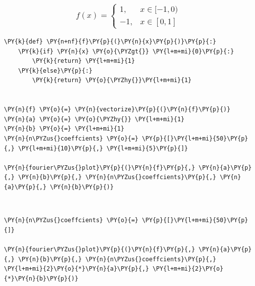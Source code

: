     \hypertarget{fx-begincases-1-x-in--1-0--1-x-in-0-1-endcases}{%
\subsubsection{\texorpdfstring{\[f(x) = \begin{cases} 1, & x \in [-1, 0) \\ -1, & x \in [0, 1] \end{cases}\]}{f(x) = \textbackslash begin\{cases\} 1, \& x \textbackslash in {[}-1, 0) \textbackslash\textbackslash{} -1, \& x \textbackslash in {[}0, 1{]} \textbackslash end\{cases\}}}\label{fx-begincases-1-x-in--1-0--1-x-in-0-1-endcases}}

    \begin{tcolorbox}[breakable, size=fbox, boxrule=1pt, pad at break*=1mm,colback=cellbackground, colframe=cellborder]
\begin{Verbatim}[commandchars=\\\{\}]
\PY{k}{def} \PY{n+nf}{f}\PY{p}{(}\PY{n}{x}\PY{p}{)}\PY{p}{:}
    \PY{k}{if} \PY{n}{x} \PY{o}{\PYZgt{}} \PY{l+m+mi}{0}\PY{p}{:}
        \PY{k}{return} \PY{l+m+mi}{1}
    \PY{k}{else}\PY{p}{:}
        \PY{k}{return} \PY{o}{\PYZhy{}}\PY{l+m+mi}{1}


\PY{n}{f} \PY{o}{=} \PY{n}{vectorize}\PY{p}{(}\PY{n}{f}\PY{p}{)}
\PY{n}{a} \PY{o}{=} \PY{o}{\PYZhy{}} \PY{l+m+mi}{1}
\PY{n}{b} \PY{o}{=} \PY{l+m+mi}{1}
\PY{n}{n\PYZus{}coeffcients} \PY{o}{=} \PY{p}{[}\PY{l+m+mi}{50}\PY{p}{,} \PY{l+m+mi}{10}\PY{p}{,} \PY{l+m+mi}{5}\PY{p}{]}

\PY{n}{fourier\PYZus{}plot}\PY{p}{(}\PY{n}{f}\PY{p}{,} \PY{n}{a}\PY{p}{,} \PY{n}{b}\PY{p}{,} \PY{n}{n\PYZus{}coeffcients}\PY{p}{,} \PY{n}{a}\PY{p}{,} \PY{n}{b}\PY{p}{)}
\end{Verbatim}
\end{tcolorbox}

    \begin{center}
    \end{center}
    { \hspace*{\fill} \\}
    
    \begin{tcolorbox}[breakable, size=fbox, boxrule=1pt, pad at break*=1mm,colback=cellbackground, colframe=cellborder]
\begin{Verbatim}[commandchars=\\\{\}]
\PY{n}{n\PYZus{}coeffcients} \PY{o}{=} \PY{p}{[}\PY{l+m+mi}{50}\PY{p}{]}

\PY{n}{fourier\PYZus{}plot}\PY{p}{(}\PY{n}{f}\PY{p}{,} \PY{n}{a}\PY{p}{,} \PY{n}{b}\PY{p}{,} \PY{n}{n\PYZus{}coeffcients}\PY{p}{,} \PY{l+m+mi}{2}\PY{o}{*}\PY{n}{a}\PY{p}{,} \PY{l+m+mi}{2}\PY{o}{*}\PY{n}{b}\PY{p}{)}
\end{Verbatim}
\end{tcolorbox}

    \begin{center}
    \end{center}
    { \hspace*{\fill} \\}
    

    
    
    
